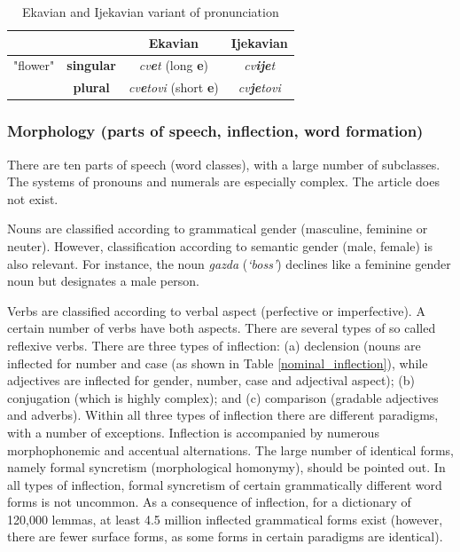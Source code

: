 \begin{multicols}{2}
\begin{table}[ht]
\begin{center}
\begin{tabular}{|c|c|c|c|}
 \hline
  \multicolumn{2}{|c|}{} & {\textbf{Ekavian}} & {\textbf{Ijekavian}} \\ 
   \hline
  {"flower"} & \textbf{singular} & \textit{cv\textbf{e}t} (long \textbf{e}) & \textit{cv\textbf{ije}t}\\ 
   \cline{2-4}
     & \textbf{plural} & \textit{cv\textbf{e}tovi} (short \textbf{e}) & \textit{cv\textbf{je}tovi} \\
  \hline
 \end{tabular}
\end{center}
\caption{Ekavian and Ijekavian variant of pronunciation}
\label{ekavian_and_ijekavian}
\end{table}


\subsubsection {Morphology (parts of speech, inflection, word formation)}

There are ten parts of speech (word classes), with a large number of subclasses. The systems of pronouns and numerals are especially complex. The article does not exist.

Nouns are classified according to grammatical gender (masculine, feminine or neuter). However, classification according to semantic gender (male, female) is also relevant. For instance, the noun \textit{gazda} (\textit{‘boss’}) declines like a feminine gender noun but designates a male person.  

Verbs are classified according to verbal aspect (perfective or imperfective). A certain number of verbs have both aspects. There are several types of so called reflexive verbs.
There are three types of inflection: (a) declension (nouns are inflected for number and case (as shown in Table \ref{nominal_inflection}), while adjectives are inflected for gender, number, case and adjectival aspect); (b) conjugation (which is highly complex); and (c) comparison (gradable adjectives and adverbs). Within all three types of inflection there are different paradigms, with a number of exceptions. Inflection is accompanied by numerous morphophonemic and accentual alternations. The large number of identical forms, namely formal syncretism (morphological homonymy), should be pointed out. In all types of inflection, formal syncretism of certain grammatically different word forms is not uncommon. As a consequence of inflection, for a dictionary of 120,000 lemmas, at least 4.5 million inflected grammatical forms exist (however, there are fewer surface forms, as some forms in certain paradigms are identical).


\end{multicols}
